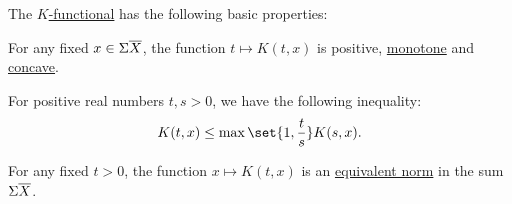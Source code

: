 \begin{proposition}\label{def:k_functional_properties}
  The \hyperref[def:k_functional]{\( K \)-functional} has the following basic properties:

  \begin{thmenum}
     For any fixed \( x \in \Sigma \oline{X} \), the function \( t \mapsto K(t, x) \) is positive, \hyperref[def:order_function]{monotone} and \hyperref[def:convex_functions]{concave}.

     For positive real numbers \( t, s > 0 \), we have the following inequality:
    \begin{equation}\label{eq:def:k_functional_properties/inequality}
      K(t, x) \leq \max\set{1, \frac t s} K(s, x).
    \end{equation}

     For any fixed \( t > 0 \), the function \( x \mapsto K(t, x) \) is an \hyperref[def:equivalent_metrics]{equivalent norm} in the sum \( \Sigma \oline{X} \).
  \end{thmenum}
\end{proposition}
